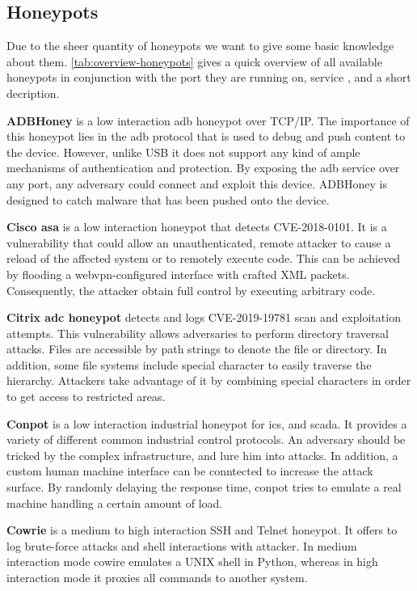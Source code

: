 \subsection{Honeypots}

Due to the sheer quantity of honeypots we want to give some basic knowledge about them. \autoref{tab:overview-honeypots} gives a quick overview of all available honeypots in conjunction with the port they are running on, service , and a short decription.

\textbf{ADBHoney} \cite{adbhoney2021} is a low interaction \ac{adb} honeypot over TCP/IP.
The importance of this honeypot lies in the \ac{adb} protocol that is used to debug and push content to the device.
However, unlike USB it does not support any kind of ample mechanisms of authentication and protection.
By exposing the \ac{adb} service over any port, any adversary could connect and exploit this device.
ADBHoney is designed to catch malware that has been pushed onto the device.

\textbf{Cisco \ac{asa}} \cite{cymmetria2018} is a low interaction honeypot that detects CVE-2018-0101\cite{CVE-2018-0101}.
It is a vulnerability that could allow an unauthenticated, remote attacker to cause a reload of the affected system or to remotely execute code.
This can be achieved by flooding a webvpn-configured interface with crafted XML packets.
Consequently, the attacker obtain full control by executing arbitrary code.

\textbf{Citrix \ac{adc} honeypot} \cite{citrixhoneypot2020} detects and logs CVE-2019-19781\cite{CVE-2019-19781} scan and exploitation attempts.
This vulnerability allows adversaries to perform directory traversal attacks.
Files are accessible by path strings to denote the file or directory.
In addition, some file systems include special character to easily traverse the hierarchy.
Attackers take advantage of it by combining special characters in order to get access to restricted areas. \cite{flanders2019}

\textbf{Conpot} \cite{conpot2021} is a low interaction industrial honeypot for \ac{ics}, and \ac{scada}.
It provides a variety of different common industrial control protocols.
An adversary should be tricked by the complex infrastructure, and lure him into attacks.
In addition, a custom human machine interface can be conntected to increase the attack surface.
By randomly delaying the response time, conpot tries to emulate a real machine handling a certain amount of load.

\textbf{Cowrie} \cite{cowire2021} is a medium to high interaction SSH and Telnet honeypot.
It offers to log brute-force attacks and shell interactions with attacker.
In medium interaction mode cowire emulates a UNIX shell in Python, whereas in high interaction mode it proxies all commands to another system.

